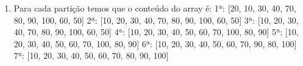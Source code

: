\documentclass[12pt, letterpaper]{article}
\begin{document}
\begin{enumerate}
\begin{enumerate}
{        }
        \item {
            Para cada partição temos que o conteúdo do array é:\newline\newline
            1ª: [20, 10, 30, 40, 70, 80, 90, 100, 60, 50]\newline
            2ª: [10, 20, 30, 40, 70, 80, 90, 100, 60, 50]\newline
            3ª: [10, 20, 30, 40, 70, 80, 90, 100, 60, 50]\newline
            4ª: [10, 20, 30, 40, 50, 60, 70, 100, 80, 90]\newline
            5ª: [10, 20, 30, 40, 50, 60, 70, 100, 80, 90]\newline
            6ª: [10, 20, 30, 40, 50, 60, 70, 90, 80, 100]\newline
            7ª: [10, 20, 30, 40, 50, 60, 70, 80, 90, 100]\newline
        }
    \end{enumerate}
    \end{enumerate}
\end{document}
